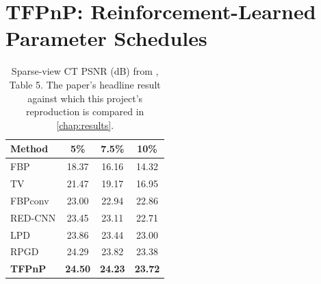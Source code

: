 \section{TFPnP: Reinforcement-Learned Parameter Schedules}
\label{sec:tfpnp}




\begin{table}[htbp]
    \centering
    \caption{Sparse-view CT PSNR (dB) from \citet{Wei2022TFPnP},
             Table 5. The paper's headline result against which
             this project's reproduction is compared in
             \cref{chap:results}.}
    \label{tab:paper-ct-results}
    \begin{tabular}{lccc}
        \toprule
        \textbf{Method} & \textbf{5\%} & \textbf{7.5\%} & \textbf{10\%} \\
        \midrule
        FBP \citep{Herman2009}          & 18.37 & 16.16 & 14.32 \\
        TV \citep{SidkyPan2008}         & 21.47 & 19.17 & 16.95 \\
        FBPconv \citep{Jin2017}         & 23.00 & 22.94 & 22.86 \\
        RED-CNN \citep{Chen2017RED}     & 23.45 & 23.11 & 22.71 \\
        LPD \citep{AdlerOktem2018}      & 23.86 & 23.44 & 23.00 \\
        RPGD \citep{Gupta2018}          & 24.29 & 23.82 & 23.38 \\
        \midrule
        \textbf{TFPnP}                  & \textbf{24.50} & \textbf{24.23} & \textbf{23.72} \\
        \bottomrule
    \end{tabular}
\end{table}


